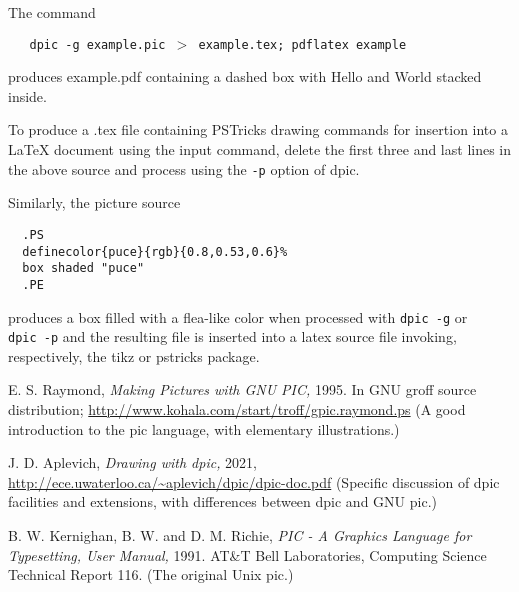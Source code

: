 The command


{\tt \ \ \ dpic\ -g\ example.pic\ $>$\ example.tex;\ pdflatex\ example}

produces example.pdf containing a dashed box with Hello and World
stacked inside.

To produce a .tex file containing PSTricks drawing commands for
insertion into a LaTeX document using the {\tt {}}input command,
delete the first three and last lines in the above source
and process using the
{\tt -p}
option of
dpic.

Similarly, the picture source

{\tt \ \ .PS}
\\\hbox{}\hskip-1pt
{\tt \ \ {\tt {}}definecolor\{puce\}\{rgb\}\{0.8,0.53,0.6\}\%}
\\\hbox{}\hskip-1pt
{\tt \ \ box\ shaded\ {\tt "}puce{\tt "}}
\\\hbox{}\hskip-1pt
{\tt \ \ .PE}

produces a box filled with a flea-like color when processed with
{\tt dpic\ -g}
or
{\tt dpic\ -p}
and the resulting file is inserted into a latex source file invoking,
respectively, the tikz or pstricks package.

E. S. Raymond,
{\it Making Pictures with GNU PIC,}
1995.
In GNU groff source distribution;
\url{http://www.kohala.com/start/troff/gpic.raymond.ps}
(A good introduction to the pic language, with elementary
illustrations.)

J. D. Aplevich,
{\it Drawing with dpic,}
2021,
\url{http://ece.uwaterloo.ca/~aplevich/dpic/dpic-doc.pdf}
(Specific discussion of dpic
facilities and extensions, with differences between dpic and GNU pic.)

B. W. Kernighan, B. W. and D. M. Richie,
{\it PIC - A Graphics Language for Typesetting, User Manual,}
1991.
AT\&T Bell Laboratories,
Computing Science Technical Report
116.
(The original Unix
pic.)

